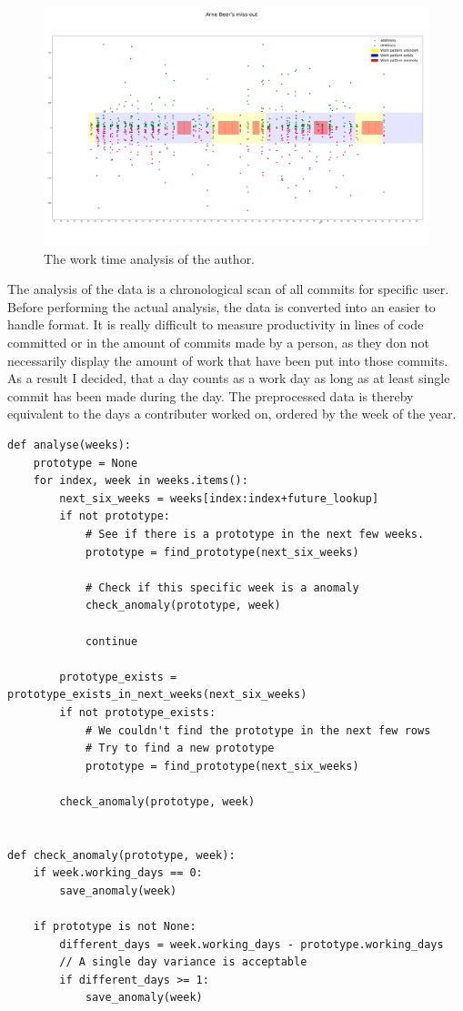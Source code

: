 \begin{figure}[H]
    \includegraphics[scale=0.20]{./graphs/analysis/work-time-analysis}
    \centering
    \caption{The work time analysis of the author.}\label{fig:missing-time}
\end{figure}

The analysis of the data is a chronological scan of all commits for specific user.
Before performing the actual analysis, the data is converted into an easier to handle format.
It is really difficult to measure productivity in lines of code committed or in the amount of commits made by a person, as they don not necessarily display the amount of work that have been put into those commits.
As a result I decided, that a day counts as a work day as long as at least single commit has been made during the day.
The preprocessed data is thereby equivalent to the days a contributer worked on, ordered by the week of the year.

\begin{verbatim}
def analyse(weeks):
    prototype = None
    for index, week in weeks.items():
        next_six_weeks = weeks[index:index+future_lookup]
        if not prototype:
            # See if there is a prototype in the next few weeks.
            prototype = find_prototype(next_six_weeks)

            # Check if this specific week is a anomaly
            check_anomaly(prototype, week)

            continue

        prototype_exists = prototype_exists_in_next_weeks(next_six_weeks)
        if not prototype_exists:
            # We couldn't find the prototype in the next few rows
            # Try to find a new prototype
            prototype = find_prototype(next_six_weeks)

        check_anomaly(prototype, week)


def check_anomaly(prototype, week):
    if week.working_days == 0:
        save_anomaly(week)

    if prototype is not None:
        different_days = week.working_days - prototype.working_days
        // A single day variance is acceptable
        if different_days >= 1:
            save_anomaly(week)

\end{verbatim}
\begingroup
{}\label{lst:miss-out-algorithm}
\endgroup


